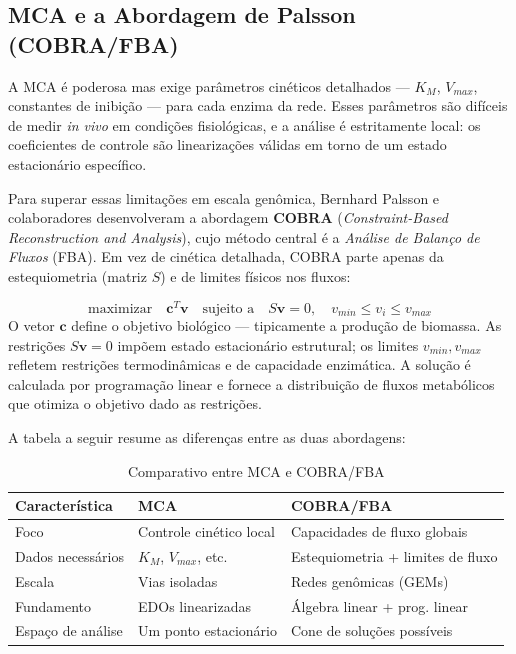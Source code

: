 \subsection{MCA e a Abordagem de Palsson (COBRA/FBA)}

A MCA é poderosa mas exige parâmetros cinéticos detalhados --- $K_M$, $V_{max}$,
constantes de inibição --- para cada enzima da rede. Esses parâmetros são difíceis de
medir \textit{in vivo} em condições fisiológicas, e a análise é estritamente local:
os coeficientes de controle são linearizações válidas em torno de um estado estacionário
específico.

Para superar essas limitações em escala genômica, Bernhard Palsson e colaboradores
desenvolveram a abordagem \textbf{COBRA} (\textit{Constraint-Based Reconstruction and
Analysis}), cujo método central é a \emph{Análise de Balanço de Fluxos} (FBA). Em vez
de cinética detalhada, COBRA parte apenas da estequiometria (matriz $S$) e de limites
físicos nos fluxos:

\begin{equation}
\text{maximizar} \quad \mathbf{c}^T \mathbf{v} \quad \text{sujeito a} \quad S \mathbf{v} = 0, \quad v_{min} \leq v_i \leq v_{max}
\end{equation}
O vetor $\mathbf{c}$ define o objetivo biológico --- tipicamente a produção de biomassa.
As restrições $S \mathbf{v} = 0$ impõem estado estacionário estrutural; os limites $v_{min},
v_{max}$ refletem restrições termodinâmicas e de capacidade enzimática. A solução é
calculada por programação linear e fornece a distribuição de fluxos metabólicos que
otimiza o objetivo dado as restrições.

A tabela a seguir resume as diferenças entre as duas abordagens:

\begin{table}[h]
\centering
\caption{Comparativo entre MCA e COBRA/FBA}
\label{tab:mca-cobra}
\begin{tabular}{lll}
\toprule
\textbf{Característica} & \textbf{MCA} & \textbf{COBRA/FBA} \\
\midrule
Foco & Controle cinético local & Capacidades de fluxo globais \\
Dados necessários & $K_M$, $V_{max}$, etc. & Estequiometria + limites de fluxo \\
Escala & Vias isoladas & Redes genômicas (GEMs) \\
Fundamento & EDOs linearizadas & Álgebra linear + prog. linear \\
Espaço de análise & Um ponto estacionário & Cone de soluções possíveis \\
\bottomrule
\end{tabular}
\end{table}

